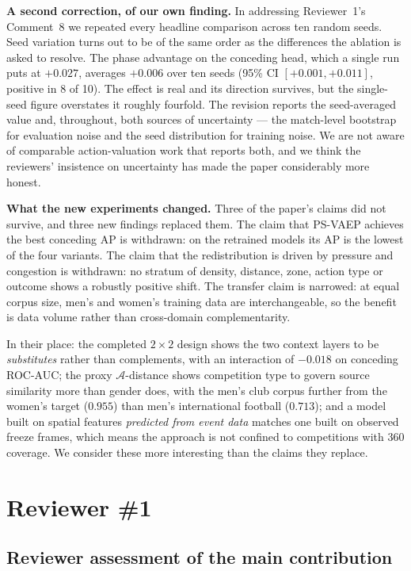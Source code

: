 \documentclass[11pt,a4paper]{article}
\begin{document}
\textbf{A second correction, of our own finding.} In addressing Reviewer~1's Comment~8 we repeated every headline comparison across ten random seeds. Seed variation turns out to be of the same order as the differences the ablation is asked to resolve. The phase advantage on the conceding head, which a single run puts at $+0.027$, averages $+0.006$ over ten seeds (95\% CI $[+0.001, +0.011]$, positive in 8 of 10). The effect is real and its direction survives, but the single-seed figure overstates it roughly fourfold. The revision reports the seed-averaged value and, throughout, both sources of uncertainty --- the match-level bootstrap for evaluation noise and the seed distribution for training noise. We are not aware of comparable action-valuation work that reports both, and we think the reviewers' insistence on uncertainty has made the paper considerably more honest.

\textbf{What the new experiments changed.} Three of the paper's claims did not survive, and three new findings replaced them. The claim that PS-VAEP achieves the best conceding AP is withdrawn: on the retrained models its AP is the lowest of the four variants. The claim that the redistribution is driven by pressure and congestion is withdrawn: no stratum of density, distance, zone, action type or outcome shows a robustly positive shift. The transfer claim is narrowed: at equal corpus size, men's and women's training data are interchangeable, so the benefit is data volume rather than cross-domain complementarity.

In their place: the completed $2 \times 2$ design shows the two context layers to be \emph{substitutes} rather than complements, with an interaction of $-0.018$ on conceding ROC-AUC; the proxy $\mathcal{A}$-distance shows competition type to govern source similarity more than gender does, with the men's club corpus further from the women's target ($0.955$) than men's international football ($0.713$); and a model built on spatial features \emph{predicted from event data} matches one built on observed freeze frames, which means the approach is not confined to competitions with 360 coverage. We consider these more interesting than the claims they replace.

\clearpage
\section{Reviewer \#1}

\subsection{Reviewer assessment of the main contribution}
\end{document}
